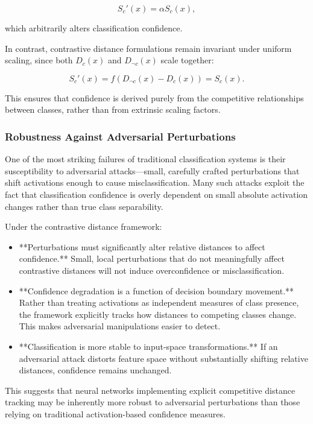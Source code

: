 \[
S_c'(x) = \alpha S_c(x),
\]

which arbitrarily alters classification confidence.

In contrast, contrastive distance formulations remain invariant under uniform scaling, since both \( D_c(x) \) and \( D_{\neg c}(x) \) scale together:

\[
S_c'(x) = f(D_{\neg c}(x) - D_c(x)) = S_c(x).
\]

This ensures that confidence is derived purely from the competitive relationships between classes, rather than from extrinsic scaling factors.

\subsubsection{Robustness Against Adversarial Perturbations}

One of the most striking failures of traditional classification systems is their susceptibility to adversarial attacks—small, carefully crafted perturbations that shift activations enough to cause misclassification. Many such attacks exploit the fact that classification confidence is overly dependent on small absolute activation changes rather than true class separability.

Under the contrastive distance framework:

\begin{itemize}
    \item **Perturbations must significantly alter relative distances to affect confidence.** Small, local perturbations that do not meaningfully affect contrastive distances will not induce overconfidence or misclassification.
    \item **Confidence degradation is a function of decision boundary movement.** Rather than treating activations as independent measures of class presence, the framework explicitly tracks how distances to competing classes change. This makes adversarial manipulations easier to detect.
    \item **Classification is more stable to input-space transformations.** If an adversarial attack distorts feature space without substantially shifting relative distances, confidence remains unchanged.
\end{itemize}

This suggests that neural networks implementing explicit competitive distance tracking may be inherently more robust to adversarial perturbations than those relying on traditional activation-based confidence measures.

